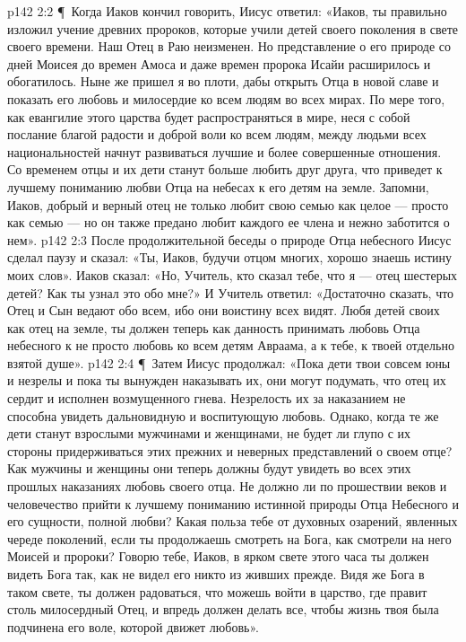 \vs p142 2:2 \P\ Когда Иаков кончил говорить, Иисус ответил: «Иаков, ты правильно изложил учение древних пророков, которые учили детей своего поколения в свете своего времени. Наш Отец в Раю неизменен. Но представление о его природе со дней Моисея до времен Амоса и даже времен пророка Исайи расширилось и обогатилось. Ныне же пришел я во плоти, дабы открыть Отца в новой славе и показать его любовь и милосердие ко всем людям во всех мирах. По мере того, как евангилие этого царства будет распространяться в мире, неся с собой послание благой радости и доброй воли ко всем людям, между людьми всех национальностей начнут развиваться лучшие и более совершенные отношения. Со временем отцы и их дети станут больше любить друг друга, что приведет к лучшему пониманию любви Отца на небесах к его детям на земле. Запомни, Иаков, добрый и верный отец не только любит свою семью как целое --- просто как семью --- но он также предано любит каждого ее  члена и нежно заботится о нем».
\vs p142 2:3 После продолжительной беседы о природе Отца небесного Иисус сделал паузу и сказал: «Ты, Иаков, будучи отцом многих, хорошо знаешь истину моих слов». Иаков сказал: «Но, Учитель, кто сказал тебе, что я --- отец шестерых детей? Как ты узнал это обо мне?» И Учитель ответил: «Достаточно сказать, что Отец и Сын ведают обо всем, ибо они воистину всех видят. Любя детей своих как отец на земле, ты должен теперь как данность принимать любовь Отца небесного к  не просто любовь ко всем детям Авраама, а к тебе, к твоей отдельно взятой душе».
\vs p142 2:4 \P\ Затем Иисус продолжал: «Пока дети твои совсем юны и незрелы и пока ты вынужден наказывать их, они могут подумать, что отец их сердит и исполнен возмущенного гнева. Незрелость их за наказанием не способна увидеть дальновидную и воспитующую любовь. Однако, когда те же дети станут взрослыми мужчинами и женщинами, не будет ли глупо с их стороны придерживаться этих прежних и неверных представлений о своем отце? Как мужчины и женщины они теперь должны будут увидеть во всех этих прошлых наказаниях любовь своего отца. Не должно ли по прошествии веков и человечество прийти к лучшему пониманию истинной природы Отца Небесного и его сущности, полной любви? Какая польза тебе от духовных озарений, явленных череде поколений, если ты продолжаешь смотреть на Бога, как смотрели на него Моисей и пророки? Говорю тебе, Иаков, в ярком свете этого часа ты должен видеть Бога так, как не видел его никто из живших прежде. Видя же Бога в таком свете, ты должен радоваться, что можешь войти в царство, где правит столь милосердный Отец, и впредь должен делать все, чтобы жизнь твоя была подчинена его воле, которой движет любовь».
